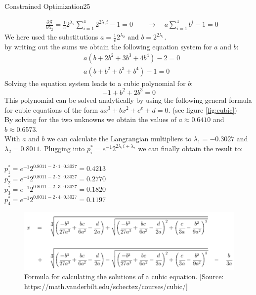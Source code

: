 \begin{questions}
\begin{question}{Constrained Optimization}{25}
\begin{answer}
\begin{equation*}
\begin{split}
& \frac{\partial\mathcal{G}}{\partial \lambda_2} = \frac{1}{e} 2^{\lambda_2}\sum_{i=1}^4 2^{2\lambda_1 i} - 1 = 0 \qquad \rightarrow \quad a\sum_{i=1}^4  b^i -1 = 0
\end{split}
\end{equation*}
We here used the substitutions $a=\frac{1}{e}2^{\lambda_2}$ and $b=2^{2\lambda_1}$.\\
by writing out the sums we obtain the following equation system for $a$ and $b$:
\begin{equation*}
\begin{split}
& a (b+2b^2+3b^3+4b^4)-2=0\\
& a (b+b^2+b^3+b^4)-1=0
\end{split}
\end{equation*} 
Solving the equation system leads to a cubic polynomial for $b$:
\begin{equation*}
-1+b^2+2b^3 = 0
\end{equation*} 
This polynomial can be solved analytically by using the following general formula for cubic equations of the form $ax^3+bx^2+c^x+d=0$. (see figure \ref{fig:cubic}) \\
By solving for the two unknowns we obtain the values of $a\approx 0.6410$ and $b\approx0.6573$.\\
 With $a$ and $b$ we can calculate the Langrangian multipliers to $\lambda_1=-0.3027$ and $\lambda_2=0.8011$.
Plugging into $p_{i}^{*}=e^{-1} 2^{2 \lambda_{1} i+\lambda_{2}}$ we can finally obtain the result to:\\ \\
$p_{1}^{*}=e^{-1} 2^{0.8011 - 2 \cdot 1 \cdot 0.3027} = 0.4213$\\
$p_{2}^{*}=e^{-1} 2^{0.8011- 2 \cdot 2 \cdot 0.3027} = 0.2770 $\\
$p_{3}^{*}=e^{-1} 2^{0.8011- 2 \cdot 3 \cdot 0.3027} = 0.1820$\\
$p_{4}^{*}=e^{-1} 2^{0.8011- 2 \cdot 4 \cdot 0.3027 }= 0.1197$
\end{answer}
\begin{figure}[h]
	\includegraphics[width=12cm, scale=0.5]{cubics.png}
	\caption{Formula for calculating the solutions of a cubic equation. [Source: https://math.vanderbilt.edu/schectex/courses/cubic/]}

\end{figure}
\end{question}
\end{questions}
